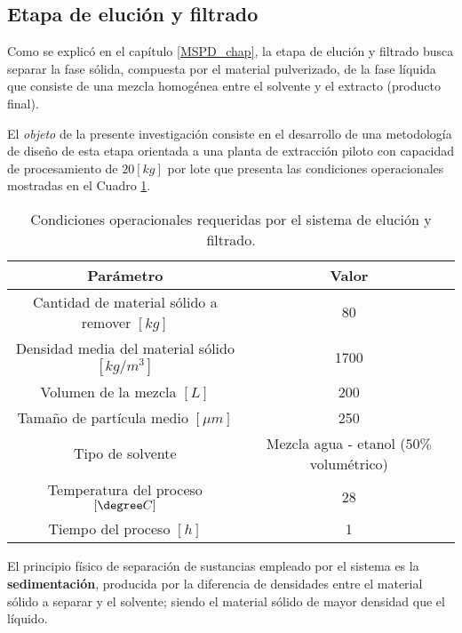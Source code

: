 \begin{center}
	\section{Etapa de eluci\'on y filtrado} \label{teorico:sed}
\end{center}

\noindent
\justify

Como se explic\'o en el cap\'itulo \ref{MSPD_chap}, la etapa de eluci\'on y filtrado busca separar la fase s\'olida, compuesta por el material pulverizado, de la fase l\'iquida que consiste de una mezcla homog\'enea entre el solvente y el extracto (producto final). 

\noindent
\justify

El \textit{objeto} de la presente investigaci\'on consiste en el desarrollo de una metodolog\'ia de dise\~no de esta etapa orientada a una planta de extracci\'on piloto con capacidad de procesamiento de $20 [kg]$ por lote que presenta las condiciones operacionales mostradas en el Cuadro \ref{condiciones}.

\begin{table}[h!]
	\centering
	\begin{tabular}{c|c}
		\hline
		\textbf{Par\'ametro} & \textbf{Valor} \\ \hline
		Cantidad de material s\'olido a remover $[kg]$ & 80 \\ \hline
		Densidad media del material s\'olido $\left[kg / m^3 \right]$ & 1700 \\ \hline
		Volumen de la mezcla $[L]$ & 200 \\ \hline
		Tama\~no de part\'icula medio $[\mu m]$ & 250 \\ \hline
		Tipo de solvente & Mezcla agua - etanol ($50 \%$ volum\'etrico) \\ \hline
		Temperatura del proceso $[\degree C]$ & 28 \\ \hline
		Tiempo del proceso $[h]$ & 1 \\ \hline
		
	\end{tabular}
	\caption{Condiciones operacionales requeridas por el sistema de eluci\'on y filtrado.}
	\label{condiciones}
\end{table}

\noindent
\justify

El principio f\'isico de separaci\'on de sustancias empleado por el sistema es la \textbf{sedimentaci\'on}, producida por la diferencia de densidades entre el material s\'olido a separar y el solvente; siendo el material s\'olido de mayor densidad que el l\'iquido.

